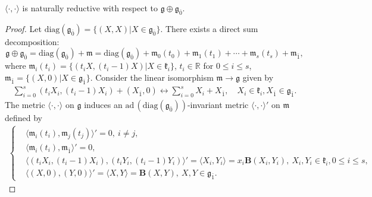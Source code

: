 \documentclass[10pt,a4paper]{amsart}
\begin{document}
 \begin{prop}
 $\langle\cdot,\cdot\rangle$ is naturally reductive with respect to $\mathfrak{g}\oplus\mathfrak{g}_{\bar{0}}$.
 \end{prop}

 \begin{proof}
Let $\mathrm{diag}(\mathfrak{g}_{\bar{0}})=\{(X,X)|X\in\mathfrak{g}_{\bar{0}}\}$.
There exists a direct sum decomposition:
$$\mathfrak{g}\oplus\mathfrak{g}_{\bar{0}}
=\mathrm{diag}(\mathfrak{g}_{\bar{0}})+\mathfrak{m}
=\mathrm{diag}(\mathfrak{g}_{\bar{0}})
+\mathfrak{m}_{0}(t_{0})+\mathfrak{m}_{1}(t_{1})+\cdots+\mathfrak{m}_{s}(t_{s})+\mathfrak{m}_{\bar{1}},$$
where
$\mathfrak{m}_{i}(t_{i})=\{(t_{i}X,(t_{i}-1)X)|X\in\mathfrak{k}_{i}\}$,
 $t_{i}\in \mathbb{R}$ for $0\leq i\leq s$,
 $\mathfrak{m}_{\bar{1}}=\{(X,0)|X\in\mathfrak{g}_{\bar{1}}\}$.
Consider the linear isomorphism  $\mathfrak{m}\rightarrow\mathfrak{g}$ given by
\begin{eqnarray*}
\sum_{i=0}^{s}(t_{i}X_{i},(t_{i}-1)X_{i})+(X_{\bar{1}},0)\longleftrightarrow \sum_{i=0}^{s}X_{i}+X_{\bar{1}}, \quad X_{i}\in\mathfrak{k}_{i}, X_{\bar{1}}\in\mathfrak{g}_{\bar{1}}.
\end{eqnarray*}
The metric $\langle\cdot,\cdot\rangle$ on $\mathfrak{g}$ induces  an $\mathrm{ad}\,(\mathrm{diag}(\mathfrak{g}_{\bar{0}}))$-invariant metric $\langle\cdot,\cdot\rangle'$ on $\mathfrak{m}$ defined by
\begin{eqnarray*}
\left\{
\begin{aligned}
& \langle \mathfrak{m}_{i}(t_{i}),\mathfrak{m}_{j}(t_{j}) \rangle'=0, \  i\neq j,\\
& \langle \mathfrak{m}_{i}(t_{i}),\mathfrak{m}_{\bar{1}} \rangle'=0,\\
& \langle (t_{i}X_{i},(t_{i}-1)X_{i}), (t_{i}Y_{i},(t_{i}-1)Y_{i})\rangle'=\langle X_{i},Y_{i}\rangle=x_{i}\mathbf{B}(X_{i},Y_{i}),
                                                                               \ X_{i},Y_{i}\in\mathfrak{k}_{i}, 0\leq i\leq s,\\
& \langle (X,0),(Y,0)\rangle'=\langle X,Y\rangle=\mathbf{B}(X,Y), \ X,Y\in\mathfrak{g}_{\bar{1}}.
\end{aligned}\right.
\end{eqnarray*}


\end{proof}
\end{document}
